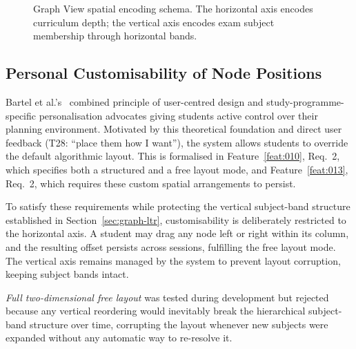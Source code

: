 \begin{figure}[htbp]
\caption{Graph View spatial encoding schema. The horizontal axis encodes curriculum depth; the vertical axis encodes exam subject membership through horizontal bands.}
\label{fig:graph-schema}
\end{figure}

\subsection{Personal Customisability of Node Positions}
\label{sec:card-ordering}

Bartel et al.'s~\cite{bartel_design_2024} combined principle of user-centred design and study-programme-specific personalisation advocates giving students active control over their planning environment. Motivated by this theoretical foundation and direct user feedback (T28: \enquote{place them how I want}), the system allows students to override the default algorithmic layout. This is formalised in Feature~\ref{feat:010}, Req.~2, which specifies both a structured and a free layout mode, and Feature~\ref{feat:013}, Req.~2, which requires these custom spatial arrangements to persist.

To satisfy these requirements while protecting the vertical subject-band structure established in Section~\ref{sec:graph-ltr}, customisability is deliberately restricted to the horizontal axis. A student may drag any node left or right within its column, and the resulting offset persists across sessions, fulfilling the free layout mode. The vertical axis remains managed by the system to prevent layout corruption, keeping subject bands intact. 

\emph{Full two-dimensional free layout} was tested during development but rejected because any vertical reordering would inevitably break the hierarchical subject-band structure over time, corrupting the layout whenever new subjects were expanded without any automatic way to re-resolve it.

